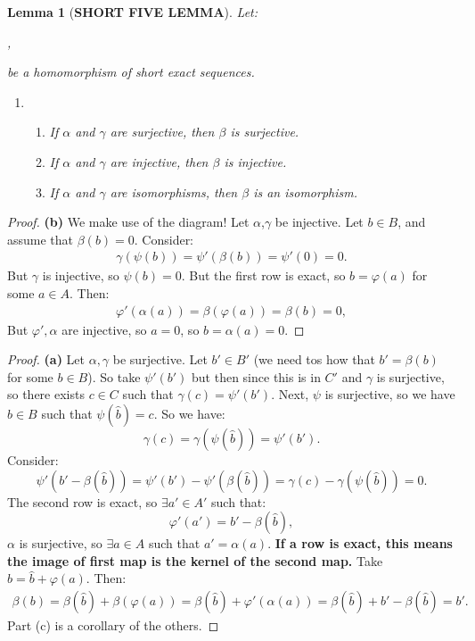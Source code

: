 \documentclass[12pt]{amsbook}
\theoremstyle{plain}
\numberwithin{section}{chapter}
\numberwithin{equation}{chapter}
\newtheorem{lem}[theorem]{Lemma}
\theoremstyle{definition}
\theoremstyle{remark}
\newcommand{\bee}{\begin{equation}\begin{aligned}}
\newcommand{\eee}{\end{aligned}\end{equation}}
\renewcommand{\phi}{\varphi}
\begin{document}
\begin{lem}[\textbf{SHORT FIVE LEMMA}]
Let:
\begin{center}
,
\end{center}
be a homomorphism of short exact sequences. 
\begin{enumerate}[]
\item[]
\begin{enumerate}
\item If $\alpha$ and $\gamma$ are surjective, then $\beta$ is surjective. 
\item If $\alpha$ and $\gamma$ are injective, then $\beta$ is injective. 
\item If $\alpha$ and $\gamma$ are isomorphisms, then $\beta$ is an isomorphism. 
\end{enumerate}
\end{enumerate}
\end{lem}

\begin{proof} 
\textbf{(b)} We make use of the diagram! Let $\alpha$,$\gamma$ be injective. Let $b \in B$, and assume that $\beta(b) = 0$. Consider:
\bee 
\gamma(\psi(b)) = \psi'(\beta(b)) = \psi'(0) = 0.
 \eee 
 But $\gamma$ is injective, so $\psi(b) = 0$. But the first row is exact, so $b = \phi(a)$ for some $a \in A$. Then:
 \bee 
 \phi'(\alpha(a)) = \beta(\phi(a)) = \beta(b) = 0,
  \eee 
  But $\phi',\alpha$ are injective, so $a = 0$, so $b = \alpha(a) = 0$. 
\end{proof}

\begin{proof} \textbf{(a)}
Let $\alpha,\gamma$ be surjective. Let $b' \in B'$ (we need tos how that $b' = \beta(b)$ for some $b \in B$). So take $\psi'(b')$ but then since this is in $C'$ and $\gamma$ is surjective, so there exists $c \in C$ such that $\gamma(c) = \psi'(b')$. Next, $\psi$ is surjective, so we have $\hat{b} \in B$ such that $\psi(\hat{b}) = c$. So we have: 
$$
\gamma(c) = \gamma(\psi(\hat{b})) = \psi'(b').
$$
Consider: 
$$
\psi'(b' - \beta(\hat{b})) = \psi'(b') - \psi'(\beta(\hat{b})) = \gamma(c) - \gamma(\psi(\hat{b})) = 0.
$$
The second row is exact, so $\exists a' \in A'$ such that:
$$
\phi'(a') = b' - \beta(\hat{b}),
$$
$\alpha$ is surjective, so $\exists a \in A$ such that $a' = \alpha(a)$. 
\textbf{If a row is exact, this means the image of first map is the kernel of the second map. } Take $b = \hat{b} + \phi(a)$. Then:
\bee 
\beta(b) = \beta(\hat{b}) + \beta(\phi(a)) = \beta(\hat{b}) +  \phi'(\alpha(a)) = \beta(\hat{b}) + b' - \beta(\hat{b}) = b'. 
\eee 
Part (c) is a corollary of the others. 
\end{proof}
\end{document}
